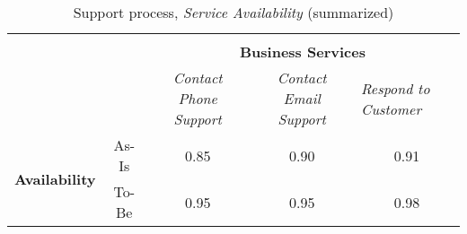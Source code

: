 \begin{table}[H]
\begin{tabular}{|c|c|p{2cm}|p{2.5cm}|p{2.5cm}|p{2.5cm}|}
		\multicolumn{6}{c}{} \\ \cline{3-6}
		\multicolumn{2}{c}{} & \multicolumn{4}{|c|}{\textbf{Business Services}} \\ \cline{3-6}
		\multicolumn{2}{c|}{} & \multicolumn{1}{|c|}{\textsl{Contact Phone Support}} & \multicolumn{2}{|c|}{\textsl{Contact Email Support}} & \multicolumn{1}{|p{2cm}|}{\textsl{Respond to Customer}}\\ \hline
		\multirow{2}{*}{\textbf{Availability}} & As-Is & \multicolumn{1}{|c|}{0.85} & \multicolumn{2}{|c|}{0.90} & \multicolumn{1}{|c|}{0.91}\\ \cline{2-6}
									   & To-Be &\multicolumn{1}{|c|}{0.95} & \multicolumn{2}{|c|}{0.95} & \multicolumn{1}{|c|}{0.98}\\ \hline
	\end{tabular}
\caption{Support process, \textsl{Service Availability} (summarized)} 
\label{tab:support_both}
\end{table}